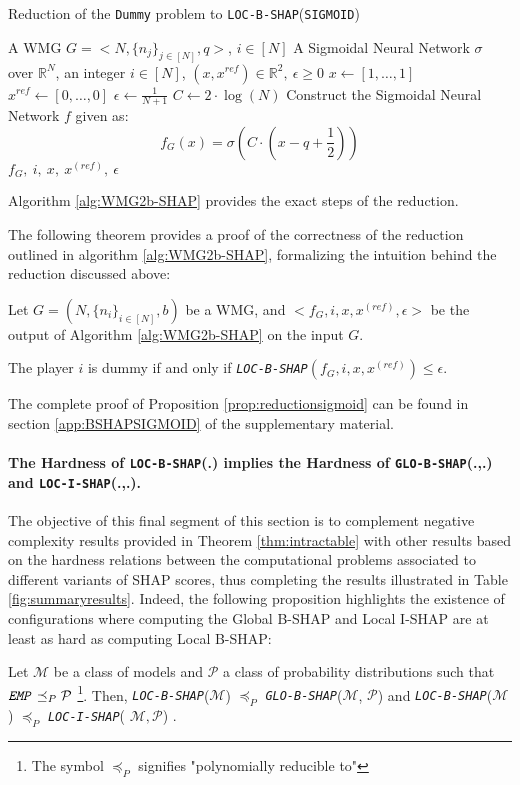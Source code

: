 {\small
\begin{algorithm}
\caption{Reduction of the \texttt{Dummy} problem to \texttt{LOC-B-SHAP}(\texttt{SIGMOID})}
\label{alg:WMG2b-SHAP}
\begin{algorithmic}[1]
\REQUIRE A WMG $G = <N, \{n_{j}\}_{j \in [N]},q>$, $i \in [N]$
\ENSURE A Sigmoidal Neural Network $\sigma$ over $\mathbb{R}^{N}$, an integer $i \in [N]$, $(x,x^{ref}) \in \mathbb{R}^{2},~\epsilon \geq 0$ 
\STATE $x \leftarrow [1 , \ldots , 1]$
\STATE $x^{ref} \leftarrow [0, \ldots , 0]$
\STATE $\epsilon \leftarrow \frac{1}{N + 1}$
\STATE $C \leftarrow 2 \cdot \log(N)$
\STATE Construct the Sigmoidal Neural Network $f$ given as:
$$f_{G}(x) = \sigma(C \cdot (x - q + \frac{1}{2}))$$
\RETURN $f_{G},~i,~x,~x^{(ref)},~\epsilon$
\end{algorithmic}
\end{algorithm}
}

Algorithm \ref{alg:WMG2b-SHAP} provides the exact steps of the reduction. 

The following theorem provides a proof of the correctness of the reduction outlined in algorithm \ref{alg:WMG2b-SHAP}, formalizing the intuition behind the reduction discussed above:
\begin{proposition} \label{prop:reductionsigmoid}
    Let $G = (N, \{n_{i}\}_{i \in [N]}, b)$ be a WMG, and $<f_{G}, i, x,x^{(ref)}, \epsilon>$ be the output of Algorithm \ref{alg:WMG2b-SHAP} on the input $G$. 

    The player $i$ is dummy if and only if \emph{\texttt{LOC-B-SHAP}}$(f_{G}, i , x, x^{(ref)}) \leq \epsilon$.
\end{proposition}

The complete proof of Proposition \ref{prop:reductionsigmoid} can be found in section \ref{app:BSHAPSIGMOID} of the supplementary material.

\paragraph{The Hardness of \texttt{LOC-B-SHAP}(.) implies the Hardness of \texttt{GLO-B-SHAP}(.,.) and \texttt{LOC-I-SHAP}(.,.).} The objective of this final segment of this section is to complement negative complexity results provided in Theorem \ref{thm:intractable} with other results based on the hardness relations between the computational problems associated to different variants of SHAP scores, thus completing the results illustrated in Table \ref{fig:summaryresults}. Indeed, the following proposition highlights the existence of configurations where computing the Global B-SHAP and Local I-SHAP are at least as hard as computing Local B-SHAP:
\begin{proposition} \label{prop:hardnessrelation}
    Let $\mathcal{M}$ be a class of models and $\mathcal{P}$ a class of probability distributions such that $\texttt{\emph{EMP}} \preceq_{P}  \mathcal{P}$ \footnote{The symbol $\preceq_{P}$ signifies "polynomially reducible to"}. Then, 
    \texttt{\emph{LOC-B-SHAP}}($\mathcal{M}$)  $\preceq_{P}$ \texttt{\emph{GLO-B-SHAP}}($\mathcal{M}$, $\mathcal{P}$) and \texttt{\emph{LOC-B-SHAP}}($\mathcal{M}$)  $\preceq_{P}$   \texttt{\emph{LOC-I-SHAP}}( $\mathcal{M}, \mathcal{P}$) .
\end{proposition}


